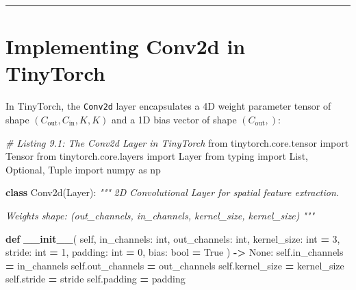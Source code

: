 \documentclass[
  letterpaper,
]{scrbook}
\newenvironment{Shaded}{\begin{snugshade}}{\end{snugshade}}
\newcommand{\BuiltInTok}[1]{#1}
\newcommand{\CommentTok}[1]{\textcolor[rgb]{0.56,0.35,0.01}{\textit{#1}}}
\newcommand{\DecValTok}[1]{\textcolor[rgb]{0.00,0.00,0.81}{#1}}
\newcommand{\FunctionTok}[1]{\textcolor[rgb]{0.13,0.29,0.53}{\textbf{#1}}}
\newcommand{\ImportTok}[1]{#1}
\newcommand{\KeywordTok}[1]{\textcolor[rgb]{0.13,0.29,0.53}{\textbf{#1}}}
\newcommand{\NormalTok}[1]{#1}
\newcommand{\OperatorTok}[1]{\textcolor[rgb]{0.81,0.36,0.00}{\textbf{#1}}}
\newcommand{\VariableTok}[1]{\textcolor[rgb]{0.00,0.00,0.00}{#1}}
\begin{document}
\begin{center}\rule{0.5\linewidth}{0.5pt}\end{center}

\section{Implementing Conv2d in
TinyTorch}\label{implementing-conv2d-in-tinytorch}

In TinyTorch, the \texttt{Conv2d} layer encapsulates a 4D weight
parameter tensor of shape \((C_{\text{out}}, C_{\text{in}}, K, K)\) and
a 1D bias vector of shape \((C_{\text{out}},)\):

\begin{Shaded}
\begin{Highlighting}[]
\CommentTok{\# Listing 9.1: The Conv2d Layer in TinyTorch}
\ImportTok{from}\NormalTok{ tinytorch.core.tensor }\ImportTok{import}\NormalTok{ Tensor}
\ImportTok{from}\NormalTok{ tinytorch.core.layers }\ImportTok{import}\NormalTok{ Layer}
\ImportTok{from}\NormalTok{ typing }\ImportTok{import}\NormalTok{ List, Optional, Tuple}
\ImportTok{import}\NormalTok{ numpy }\ImportTok{as}\NormalTok{ np}

\KeywordTok{class}\NormalTok{ Conv2d(Layer):}
    \CommentTok{"""}
\CommentTok{    2D Convolutional Layer for spatial feature extraction.}

\CommentTok{    Weights shape: (out\_channels, in\_channels, kernel\_size, kernel\_size)}
\CommentTok{    """}

    \KeywordTok{def} \FunctionTok{\_\_init\_\_}\NormalTok{(}
        \VariableTok{self}\NormalTok{,}
\NormalTok{        in\_channels: }\BuiltInTok{int}\NormalTok{,}
\NormalTok{        out\_channels: }\BuiltInTok{int}\NormalTok{,}
\NormalTok{        kernel\_size: }\BuiltInTok{int} \OperatorTok{=} \DecValTok{3}\NormalTok{,}
\NormalTok{        stride: }\BuiltInTok{int} \OperatorTok{=} \DecValTok{1}\NormalTok{,}
\NormalTok{        padding: }\BuiltInTok{int} \OperatorTok{=} \DecValTok{0}\NormalTok{,}
\NormalTok{        bias: }\BuiltInTok{bool} \OperatorTok{=} \VariableTok{True}
\NormalTok{    ) }\OperatorTok{{-}\textgreater{}} \VariableTok{None}\NormalTok{:}
        \VariableTok{self}\NormalTok{.in\_channels }\OperatorTok{=}\NormalTok{ in\_channels}
        \VariableTok{self}\NormalTok{.out\_channels }\OperatorTok{=}\NormalTok{ out\_channels}
        \VariableTok{self}\NormalTok{.kernel\_size }\OperatorTok{=}\NormalTok{ kernel\_size}
        \VariableTok{self}\NormalTok{.stride }\OperatorTok{=}\NormalTok{ stride}
        \VariableTok{self}\NormalTok{.padding }\OperatorTok{=}\NormalTok{ padding}


\end{Highlighting}
\end{Shaded}
\end{document}
